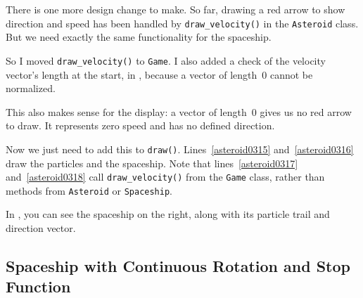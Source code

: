 
\begin{figure}%
	\begin{center}%
		\vspace{-2em}%
	\end{center}%
\end{figure}%
There is one more design change to make. So far, drawing a red arrow to show direction and speed has been handled by \texttt{draw\_velocity()} in the \texttt{Asteroid} class. But we need exactly the same functionality for the spaceship.

So I moved \texttt{draw\_velocity()} to \texttt{Game}. I also added a check of the velocity vector's length at the start, in , because a vector of length~0 cannot be normalized.

This also makes sense for the display: a vector of length~0 gives us no red arrow to draw. It represents zero speed and has no defined direction.


Now we just need to add this to \texttt{draw()}. Lines~\ref{asteroid0315} and~\ref{asteroid0316} draw the particles and the spaceship. Note that lines~\ref{asteroid0317} and~\ref{asteroid0318} call \texttt{draw\_velocity()} from the \texttt{Game} class, rather than methods from \texttt{Asteroid} or \texttt{Spaceship}.


In , you can see the spaceship on the right, along with its particle trail and direction vector.

\subsection{Spaceship with Continuous Rotation and Stop Function}\label{secVectorSpaceshipRotationStop}

